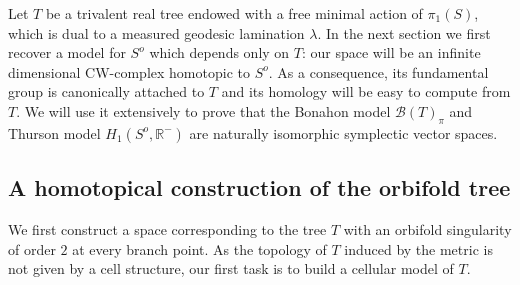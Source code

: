 \documentclass{amsart}
\newcommand{\R}{\mathbb{R}}
\newcommand{\Bb}{\mathcal{B}}
\begin{document}
Let $T$ be a trivalent real tree endowed with a free minimal action of $\pi_1(S)$, which is dual to a measured geodesic lamination $\lambda$. %
In the next section we first recover a model for $S^o$ which depends only on $T$: our space will be an infinite dimensional CW-complex homotopic to $S^o$. As a consequence, its fundamental group is canonically attached to $T$ and its homology will be easy to compute from $T$. We will use it extensively to prove that the Bonahon model $\Bb(T)_\pi$ and Thurson model $H_1(S^o,\R^-)$ are naturally isomorphic symplectic vector spaces. 


\subsection{A homotopical construction of the orbifold tree}

We first construct a space corresponding to the tree $T$ with an orbifold singularity of order $2$ at every branch point.
%
As the topology of $T$ induced by the metric is not given by a cell structure, our first task is to build a cellular model of $T$.
\end{document}
